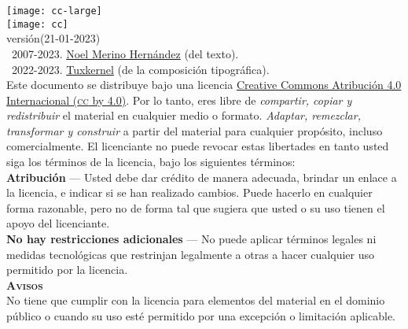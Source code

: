 \documentclass[14pt,twoside,final]{extbook} %
\begin{document}
\clearpage
\newpage
\pagestyle{empty}
\vspace*{0pt}
\vfill
\begin{scriptsize}
\begin{flushleft}
\begin{minipage}{7.5cm}
\texttt{[image: cc-large]}\label{fig:cc-large} \\

\texttt{[image: cc]}\label{fig:cc} \\

\def\fileversion{1.020}
\def\filedate{(21-01-2023)}
versión\space\fileversion\space\filedate \\

\textcopyright\ 2007-2023. \href{noel_merino@yahoo.com.mx}{Noel Merino Hernández} (del texto). \\ \textcopyright\ 2022-2023. \href{muxkernel@gmail.com}{Tuxkernel} (de la composición tipográfica). \\

\noindent Este documento se distribuye bajo una licencia \href{https://creativecommons.org/licenses/by/4.0/deed.es}{Creative Commons Atribución 4.0 Internacional (\textsc{cc} by 4.0)}. Por lo tanto, eres libre de \emph{compartir, copiar y redistribuir} el material en cualquier medio o formato. \emph{Adaptar, remezclar, transformar y construir} a partir del material para cualquier propósito, incluso comercialmente. El licenciante no puede revocar estas libertades en tanto usted siga los términos de la licencia, bajo los siguientes términos: \\

\noindent \textbf{Atribución} --- Usted debe dar crédito de manera adecuada, brindar un enlace a la licencia, e indicar si se han realizado cambios. Puede hacerlo en cualquier forma razonable, pero no de forma tal que sugiera que usted o su uso tienen el apoyo del licenciante. \\

\noindent \textbf{No hay restricciones adicionales} --- No puede aplicar términos legales ni medidas tecnológicas que restrinjan legalmente a otras a hacer cualquier uso permitido por la licencia. \\

\noindent \textbf{\textsc{Avisos}} \\

\noindent No tiene que cumplir con la licencia para elementos del material en el dominio público o cuando su uso esté permitido por una excepción o limitación aplicable. \\


\end{minipage}
\end{flushleft}
\end{scriptsize}
\end{document}
